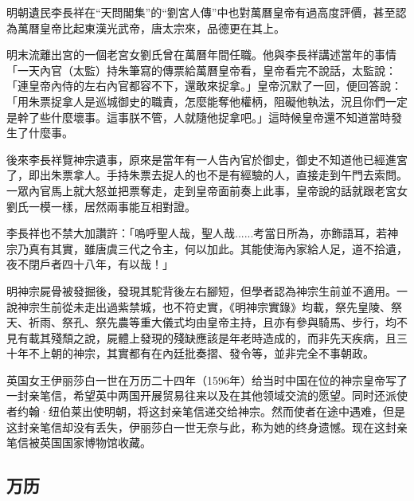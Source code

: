 明朝遺民李長祥在“天問閣集”的“劉宮人傳”中也對萬曆皇帝有過高度評價，甚至認為萬曆皇帝比起東漢光武帝，唐太宗來，品德更在其上。

明末流離出宮的一個老宮女劉氏曾在萬曆年間任職。他與李長祥講述當年的事情「一天內官（太監）持朱筆寫的傳票給萬曆皇帝看，皇帝看完不說話，太監說：「連皇帝內侍的左右內官都容不下，還敢來捉拿。」皇帝沉默了一回，便回答說：「用朱票捉拿人是巡城御史的職責，怎麼能奪他權柄，阻礙他執法，況且你們一定是幹了些什麼壞事。這事朕不管，人就隨他捉拿吧。」這時候皇帝還不知道當時發生了什麼事。

後來李長祥覽神宗遺事，原來是當年有一人告內官於御史，御史不知道他已經進宮了，即出朱票拿人。手持朱票去捉人的也不是有經驗的人，直接走到午門去索問。一眾內官馬上就大怒並把票奪走，走到皇帝面前奏上此事，皇帝說的話就跟老宮女劉氏一模一樣，居然兩事能互相對證。

李長祥也不禁大加讚許：「嗚呼聖人哉，聖人哉......考當日所為，亦飾語耳，若神宗乃真有其實，雖唐虞三代之令主，何以加此。其能使海內家給人足，道不拾遺，夜不閉戶者四十八年，有以哉！」

明神宗屍骨被發掘後，發現其駝背後左右腳短，但學者認為神宗生前並不適用。一說神宗生前從未走出過紫禁城，也不符史實，《明神宗實錄》均載，祭先皇陵、祭天、祈雨、祭孔、祭先農等重大儀式均由皇帝主持，且亦有參與騎馬、步行，均不見有載其殘頹之說，屍體上發現的殘缺應該是年老時造成的，而非先天疾病，且三十年不上朝的神宗，其實都有在內廷批奏摺、發令等，並非完全不事朝政。

英国女王伊丽莎白一世在万历二十四年（1596年）给当时中国在位的神宗皇帝写了一封亲笔信，希望英中两国开展贸易往来以及在其他领域交流的愿望。同时还派使者约翰·纽伯莱出使明朝，将这封亲笔信递交给神宗。然而使者在途中遇难，但是这封亲笔信却没有丢失，伊丽莎白一世无奈与此，称为她的终身遗憾。现在这封亲笔信被英国国家博物馆收藏。



\subsection{万历}

